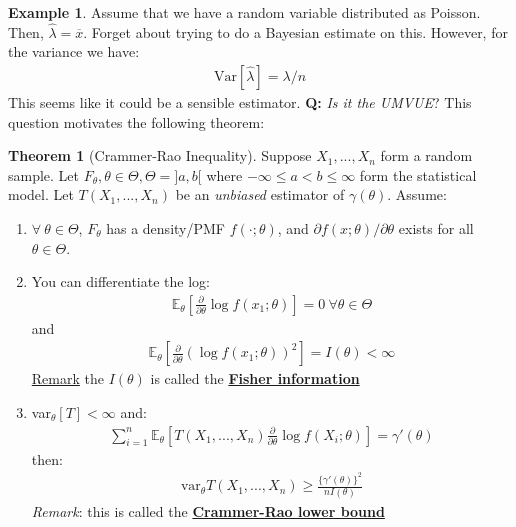 \documentclass[11pt]{scrartcl}
\theoremstyle{definition}
\newtheorem{theorem}{Theorem}
\newtheorem{ex}{Example}
\theoremstyle{remark}
\newcommand{\dfn}[1]{\textbf{\underline{#1}}}
\newcommand{\EXth}[1]{\mathbb{E}_\theta \left[ #1 \right]}
\begin{document}
{\begin{ex} 
Assume that we have a random variable distributed as Poisson. Then, $\hat{\lambda} = \overline{x}$. Forget about trying to do a Bayesian estimate on this. However, for the variance we have: 
	\begin{align*}
		\text{Var}[\hat{\lambda}] = \lambda / n 
	\end{align*}
	This seems like it could be a sensible estimator. \textbf{Q:} \emph{Is it the UMVUE}? This question motivates the following theorem: 
\end{ex}

\begin{theorem}[Crammer-Rao Inequality]
	Suppose $X_1, ..., X_n$ form a random sample. Let $F_\theta, \theta \in \Theta, \Theta = ]a,b[$ where $-\infty \leq a < b \leq \infty$ form the statistical model. Let $T(X_1, ..., X_n)$ be an \emph{unbiased} estimator of $\gamma(\theta)$. Assume: 
	\begin{enumerate}[noitemsep]
		\item $\forall\ \theta \in \Theta$, $F_\theta$ has a density/PMF $f(\cdot; \theta)$, and $\partial f(x; \theta) / \partial \theta$ exists for all $\theta \in \Theta$. 
		\item You can differentiate the log: 
		\begin{align*}
			\EXth{\frac{\partial}{\partial \theta} \log f(x_1; \theta)} = 0\ \forall \theta \in \Theta 	
		\end{align*}
		and 
		\begin{align*}
			\EXth{\frac{\partial}{\partial \theta} \left(  \log f(x_1; \theta) \right)^2 } = I(\theta) < \infty 	
		\end{align*}
		\underline{Remark} the $I(\theta)$ is called the \dfn{Fisher information}
		\item var$_\theta[T] < \infty$ and: 
		\begin{align*}
			\sum_{i=1}^n \EXth{T(X_1, ..., X_n) \frac{\partial}{\partial \theta} \log f(X_i; \theta)} = \gamma'(\theta)  
		\end{align*}
		then: 
		\begin{align*}	
			\text{var}_\theta T(X_1, ..., X_n) \geq \frac{\{ \gamma'(\theta) \}^2}{nI(\theta)}	
		\end{align*}
		\emph{Remark}: this is called the \dfn{Crammer-Rao lower bound} 
	\end{enumerate}
\end{theorem}

}
\end{document}
